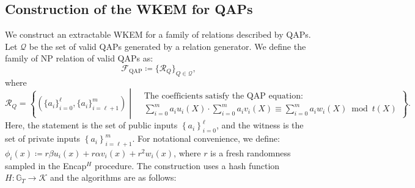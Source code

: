 \subsection{Construction of the WKEM for QAPs}
We construct an extractable WKEM for a family of relations described by QAPs. Let $\mathcal{Q}$ be the set of valid QAPs generated by a relation generator. We define the family of NP relation of valid QAPs as:
\begin{equation*}
    \mathcal{F}_\text{QAP} \coloneq \{ \mathcal{R}_Q \}_{Q \in \mathcal{Q}},
\end{equation*}
where
\begin{equation*}
    \mathcal{R}_Q = \left\{
        (\{a_i\}_{i=0}^\ell, \{a_i\}_{i=\ell+1}^m) \middle\vert
        \begin{aligned}
            &\text{The coefficients satisfy the QAP equation:} \\
            &\sum_{i=0}^m a_i u_i(X) \cdot \sum_{i=0}^m a_i v_i(X) \equiv \sum_{i=0}^m a_i w_i(X) \bmod t(X)
        \end{aligned}
    \right\}.
\end{equation*}
Here, the statement is the set of public inputs $\left\{a_i\right\}_{i=0}^\ell$, and the witness is the set of private inputs $\left\{a_i\right\}_{i=\ell+1}^m$. For notational convenience, we define: $\phi_i(x) \coloneq r\beta u_i(x) + r\alpha v_i(x) + r^2w_i(x)$, where $r$ is a fresh randomness sampled in the Encap$^H$ procedure. The construction uses a hash function $H:\mathbb{G}_T\to\mathcal{K}$ and the algorithms are as follows:


